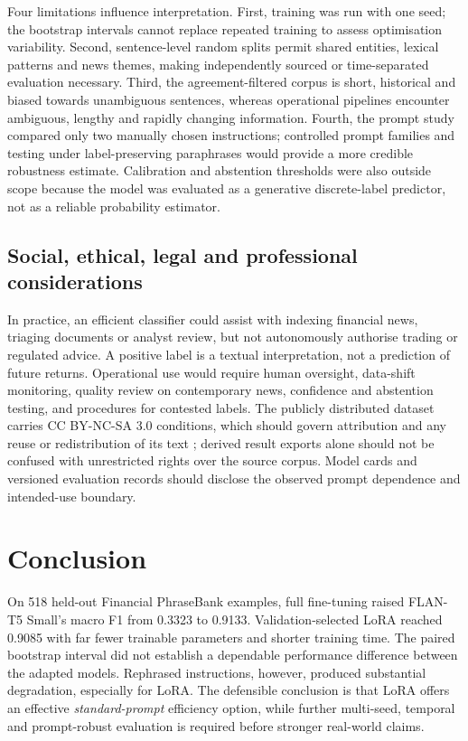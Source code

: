 \documentclass[conference,a4paper]{IEEEtran}
\begin{document}
Four limitations influence interpretation. First, training was run with one seed; the bootstrap intervals cannot replace repeated training to assess optimisation variability. Second, sentence-level random splits permit shared entities, lexical patterns and news themes, making independently sourced or time-separated evaluation necessary. Third, the agreement-filtered corpus is short, historical and biased towards unambiguous sentences, whereas operational pipelines encounter ambiguous, lengthy and rapidly changing information. Fourth, the prompt study compared only two manually chosen instructions; controlled prompt families and testing under label-preserving paraphrases would provide a more credible robustness estimate. Calibration and abstention thresholds were also outside scope because the model was evaluated as a generative discrete-label predictor, not as a reliable probability estimator.

\subsection{Social, ethical, legal and professional considerations}
In practice, an efficient classifier could assist with indexing financial news, triaging documents or analyst review, but not autonomously authorise trading or regulated advice. A positive label is a textual interpretation, not a prediction of future returns. Operational use would require human oversight, data-shift monitoring, quality review on contemporary news, confidence and abstention testing, and procedures for contested labels. The publicly distributed dataset carries CC BY-NC-SA 3.0 conditions, which should govern attribution and any reuse or redistribution of its text \cite{phrasebank}; derived result exports alone should not be confused with unrestricted rights over the source corpus. Model cards and versioned evaluation records should disclose the observed prompt dependence and intended-use boundary.

\section{Conclusion}
On 518 held-out Financial PhraseBank examples, full fine-tuning raised FLAN-T5 Small's macro F1 from 0.3323 to 0.9133. Validation-selected LoRA reached 0.9085 with far fewer trainable parameters and shorter training time. The paired bootstrap interval did not establish a dependable performance difference between the adapted models. Rephrased instructions, however, produced substantial degradation, especially for LoRA. The defensible conclusion is that LoRA offers an effective \emph{standard-prompt} efficiency option, while further multi-seed, temporal and prompt-robust evaluation is required before stronger real-world claims.
\end{document}
